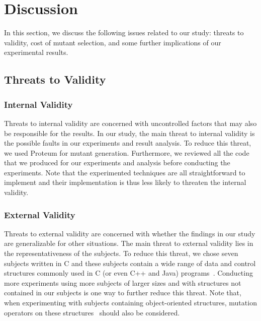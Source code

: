 \vspace{-2ex}
\section{Discussion}
\label{Discussion}

In this section, we discuss the following issues related to our
study: threats to validity, cost of mutant selection, and some
further implications of our experimental results.

\vspace{-1.5ex}
\subsection{Threats to Validity}
\label{Threats} \vspace{-1.5ex}
\subsubsection{Internal Validity}
\label{Internal}

Threats to internal validity are concerned with uncontrolled
factors that may also be responsible for the results. In our
study, the main threat to internal validity is the possible faults
in our experiments and result analysis. To reduce this threat, we
used Proteum for mutant generation. Furthermore, we reviewed all
the code that we produced for our experiments and analysis before
conducting the experiments. Note that the experimented techniques
are all straightforward to implement and their implementation is
thus less likely to threaten the internal validity.

\vspace{-1.5ex}
\subsubsection{External Validity}
\label{External}

Threats to external validity are concerned with whether the
findings in our study are generalizable for other situations. The
main threat to external validity lies in the representativeness of
the subjects. To reduce this threat, we chose seven subjects
written in C and these subjects contain a wide range of data and
control structures commonly used in C (or even C++ and Java)
programs~\cite{SiamiNamin:08}. Conducting more experiments using
more subjects of larger sizes and with structures not contained in
our subjects is one way to further reduce this threat. Note that,
when experimenting with subjects containing object-oriented
structures, mutation operators on these structures~\cite{Ma:05}
should also be considered.


